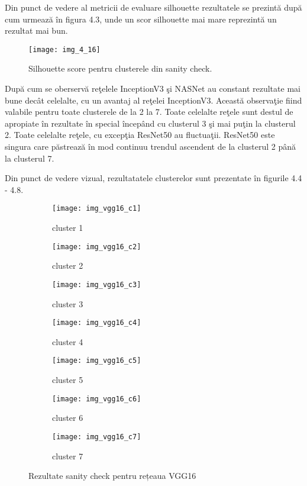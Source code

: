 Din punct de vedere al metricii de evaluare silhouette rezultatele se prezintă după cum urmează în figura 4.3, unde un scor silhouette mai mare reprezintă un rezultat mai bun.
\begin{figure}[!h]
	\centering
	\texttt{[image: img\_4\_16]}
	\caption[Silhouette score pentru clusterele din sanity check]{Silhouette score pentru clusterele din sanity check.}
\end{figure} 
După cum se oberservă reţelele InceptionV3 şi NASNet au constant rezultate mai bune decât celelalte, cu un avantaj al reţelei InceptionV3. Această observaţie
fiind valabile pentru toate clusterele de la 2 la 7. Toate celelalte reţele sunt destul de
apropiate în rezultate în special începând cu clusterul 3 şi mai puţin la clusterul 2. Toate
celelalte reţele, cu excepţia ResNet50 au fluctuaţii. ResNet50 este singura care păstrează
în mod continuu trendul ascendent de la clusterul 2 până la clusterul 7.

Din punct de vedere vizual, rezultatatele clusterelor sunt prezentate în figurile 4.4 - 4.8.
\begin{figure}[!h]
  \centering
  \begin{subfigure}[t]{0.45\textwidth}
    \caption{cluster 1}
    \texttt{[image: img\_vgg16\_c1]}
  \end{subfigure}
  \hfill
  \begin{subfigure}[t]{0.45\textwidth}
    \caption{cluster 2}
    \texttt{[image: img\_vgg16\_c2]}
  \end{subfigure}
   \hfill
  \begin{subfigure}[t]{0.45\textwidth}
    \caption{cluster 3}
    \texttt{[image: img\_vgg16\_c3]}
  \end{subfigure}
  \hfill
  \begin{subfigure}[t]{0.45\textwidth}
    \caption{cluster 4}
    \texttt{[image: img\_vgg16\_c4]}
  \end{subfigure}
  \hfill
  \begin{subfigure}[t]{0.45\textwidth}
    \caption{cluster 5}
    \texttt{[image: img\_vgg16\_c5]}
  \end{subfigure}
  \hfill
  \begin{subfigure}[t]{0.45\textwidth}
    \caption{cluster 6}
    \texttt{[image: img\_vgg16\_c6]}
  \end{subfigure}
    \hfill
  \begin{subfigure}[t]{0.45\textwidth}
    \caption{cluster 7}
    \texttt{[image: img\_vgg16\_c7]}
  \end{subfigure}
  \caption[Rezultate sanity check pentru rețeaua VGG16]{Rezultate sanity check pentru rețeaua VGG16}
\end{figure}

